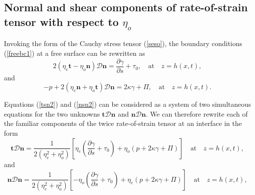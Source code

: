 \documentclass[%
 amsmath,amssymb,
 aps,
10.5pt]{revtex4-2}
\def\bm#1{\mbox{\boldmath{$#1$}}}
\def\rr#1{(\ref{#1})}
\newcommand{\be}{\begin{equation}}
\newcommand{\ee}{\end{equation}}
\begin{document}
%



\subsection{Normal and shear components of rate-of-strain tensor with respect to $\eta_o$}
Invoking the form of the Cauchy stress tensor \rr{seso},  
the
boundary conditions \rr{freebc1} at a free surface can be rewritten as 
\be \label{tsn2}
2\left(\eta_e\mathbf{t}-{\eta_o} \mathbf{n} \right)
\mathcal{D} \mathbf{n} = \frac{\partial \gamma}{\partial s} + \tau_0, \quad \textrm{at}\quad
z = h(x,t),
\ee
and 
\be \label{nsn2}
 -p + 2\left(\eta_e\mathbf{n}+{\eta_o}\mathbf{t} \right)
\mathcal{D} \mathbf{n}=2\kappa \gamma + \Pi,  \quad \textrm{at}\quad
z = h(x,t). 
\ee




Equations \rr{tsn2} and \rr{nsn2} can be considered as a system of two simultaneous equations for the
two unknowns $\mathbf{t} \mathcal{D} \mathbf{n} $ and $\mathbf{n} \mathcal{D} \mathbf{n} $.  
We can therefore rewrite each of the familiar components of the twice rate-of-strain tensor 
at an interface  in the form
\be \label{tDn}
\mathbf{t} \mathcal{D} \mathbf{n} = \frac{1}{2(\eta_e^2  + \eta_o^2)} \left[ \eta_e\left( \frac{\partial \gamma}{\partial s} + \tau_0 \right) + \eta_o (p + 2\kappa \gamma +\Pi )        \right]
\quad \textrm{at}\quad
z = h(x,t),
\ee
and 
\be \label{nDn}
\mathbf{n} \mathcal{D} \mathbf{n} = \frac{1}{2(\eta_e^2  + \eta_o^2)} \left[ -\eta_o\left( \frac{\partial \gamma}{\partial s} + \tau_0 \right) + \eta_e (p + 2\kappa \gamma     +\Pi )  \right]
\quad \textrm{at}\quad
z = h(x,t),
\ee
\end{document}
